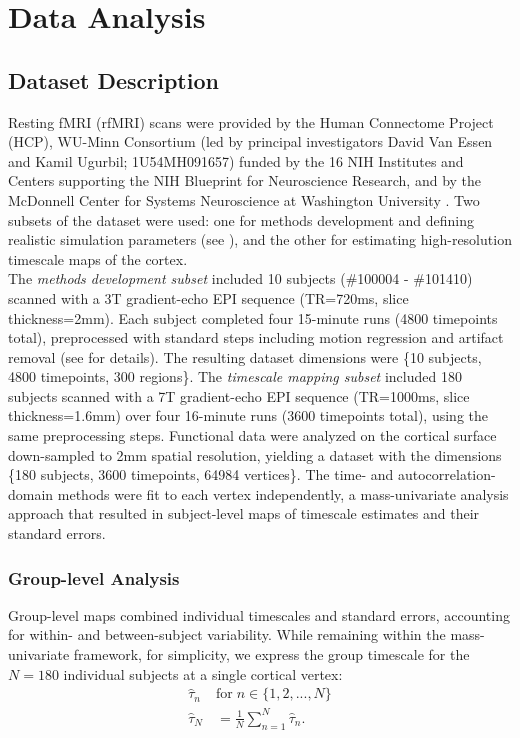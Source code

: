 \documentclass[latex/main.tex]{subfiles}
\begin{document}
\section{Data Analysis}

\subsection{Dataset Description}\label{sec:dataset-description}

Resting fMRI (rfMRI) scans were provided by the Human Connectome Project (HCP), WU-Minn Consortium (led by principal investigators David Van Essen and Kamil Ugurbil; 1U54MH091657) funded by the 16 NIH Institutes and Centers supporting the NIH Blueprint for Neuroscience Research, and by the McDonnell Center for Systems Neuroscience at Washington University \citep{van_essen_wu-minn_2013}. Two subsets of the dataset were used: one for methods development and defining realistic simulation parameters (see ), and the other for estimating high-resolution timescale maps of the cortex.\\

The \textit{methods development subset} included 10 subjects  (\#100004 - \#101410) scanned with a 3T gradient-echo EPI sequence (TR=720ms, slice thickness=2mm). Each subject completed four 15-minute runs (4800 timepoints total), preprocessed with standard steps including motion regression and artifact removal (see \citet{glasser_minimal_2013} for details). The resulting dataset dimensions were \{10 subjects, 4800 timepoints, 300 regions\}. The \textit{timescale mapping subset} included 180 subjects scanned with a 7T gradient-echo EPI sequence (TR=1000ms, slice thickness=1.6mm) over four 16-minute runs (3600 timepoints total), using the same preprocessing steps. Functional data were analyzed on the cortical surface down-sampled to 2mm spatial resolution, yielding a dataset with the dimensions \{180 subjects, 3600 timepoints, 64984 vertices\}. The time- and autocorrelation-domain methods were fit to each vertex independently, a mass-univariate analysis approach that resulted in subject-level maps of timescale estimates and their standard errors.\\

\subsubsection{Group-level Analysis}\label{sec:group-level-analysis}
Group-level maps combined individual timescales and standard errors, accounting for within- and between-subject variability. While remaining within the mass-univariate framework, for simplicity, we express the group timescale for the $N=180$ individual subjects at a single cortical vertex:
\begin{align}
    \hat\tau_n \; &\text{for} \; n\in\{1, 2, ..., N\}\\
    \hat\tau_N &= \frac{1}{N} \sum_{n=1}^N \hat\tau_n.
\end{align}
\end{document}

